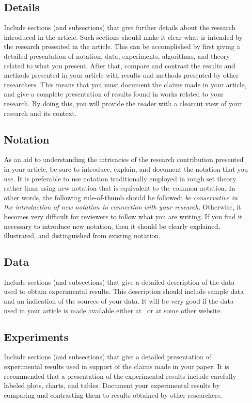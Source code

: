 \documentclass{llncs}
\begin{document}
\subsection{Details} Include sections (and subsections) that give further details about the research introduced in the article.  Such sections should make it clear what is intended by the research presented in the article.  This can be accomplished by first giving a detailed presentation of notation, data, experiments, algorithms, and theory related to what you present.  After that, compare and contrast the results and methods presented in your article with results and methods presented by other researchers.  This means that you must document the claims made in your article, and give a complete presentation of results found in works related to your research.  By doing this, you will provide the reader with a clearcut view of your research and its context.

\subsection{Notation} As an aid to understanding the intricacies of the research contribution presented in your article, be sure to introduce, explain, and document the notation that you use.  It is preferable to use notation traditionally employed in rough set theory rather than using new notation that is equivalent to the common notation.  In other words, the following rule-of-thumb should be followed: {\it be conservative in the introduction of new notation in connection with your research}.  Otherwise, it becomes very difficult for reviewers to follow what you are writing.  If you find it necessary to introduce new notation, then it should be clearly explained, illustrated, and distinguished from existing notation.

\subsection{Data} Include sections (and subsections) that give a detailed description of the data used to obtain experimental results.  This description should include sample data and an indication of the sources of your data.  It will be very good if the data used in your article is made available either at~\cite{IRSS} or at some other website.

\subsection{Experiments} Include sections (and subsections) that give a detailed presentation of experimental results used in support of the claims made in your paper.   It is recommended that a presentation of the experimental results include carefully labeled plots, charts, and tables.  Document your experimental results by comparing and contrasting them to results obtained by other researchers.
\end{document}

